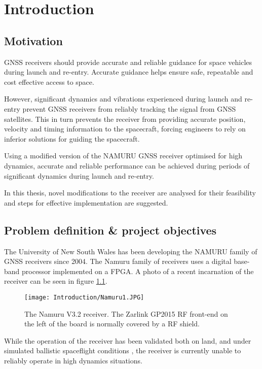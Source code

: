 \chapter{Introduction}\label{ch:intro}

\section{Motivation}
\ac{GNSS} receivers should provide accurate and reliable guidance for space vehicles during launch and re-entry. Accurate guidance helps ensure safe, repeatable and cost effective access to space.

However, significant dynamics and vibrations experienced during launch and re-entry prevent \ac{GNSS} receivers from reliably tracking the signal from \ac{GNSS} satellites. This in turn prevents the receiver from providing accurate position, velocity and timing information to the spacecraft, forcing engineers to rely on inferior solutions for guiding the spacecraft.

Using a modified version of the \ac{NAMURU} \ac{GNSS} receiver optimised for high dynamics, accurate and reliable performance can be achieved during periods of significant dynamics during launch and re-entry. 

In this thesis, novel modifications to the receiver are analysed for their feasibility and steps for effective implementation are suggested.

\section{Problem definition \& project objectives}

The University of New South Wales has been developing the \ac{NAMURU} family of \ac{GNSS} receivers since 2004\cite{MumfordNamuru}. The Namuru family of receivers uses a digital base-band processor implemented on a \ac{FPGA}\cite{Glennon11aquariusfirmware}. A photo of a recent incarnation of the receiver can be seen in figure \ref{fig:Namuru1}.

\begin{figure}[!htb] 
    \centering
    \texttt{[image: Introduction/Namuru1.JPG]} 
    \caption{The Namuru V3.2 receiver. The Zarlink GP2015 \ac{RF} front-end on the left of the board is normally covered by a \ac{RF} shield.}
    \label{fig:Namuru1}
\end{figure}

While the operation of the receiver has been validated both on land, and under simulated ballistic spaceflight conditions \cite{NamuruSpaceflight1,NamuruSpaceflight2}, the receiver is currently unable to reliably operate in high dynamics situations. 

